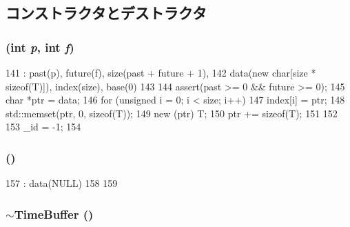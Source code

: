 \subsection{コンストラクタとデストラクタ}
\hypertarget{classTimeBuffer_afd7add7e4b5514997557fe25434baeeb}{
\subsubsection[{TimeBuffer}]{ (int {\em p}, \/  int {\em f})}}
\label{classTimeBuffer_afd7add7e4b5514997557fe25434baeeb}



\begin{DoxyCode}
141         : past(p), future(f), size(past + future + 1), 
142           data(new char[size * sizeof(T)]), index(size), base(0)
143     {
144         assert(past >= 0 && future >= 0);
145         char *ptr = data;
146         for (unsigned i = 0; i < size; i++) {
147             index[i] = ptr;
148             std::memset(ptr, 0, sizeof(T));
149             new (ptr) T;
150             ptr += sizeof(T);
151         }
152 
153         _id = -1;
154     }
\end{DoxyCode}
\hypertarget{classTimeBuffer_ac346efdd68c85717035a34ec112482f3}{
\subsubsection[{TimeBuffer}]{ ()}}
\label{classTimeBuffer_ac346efdd68c85717035a34ec112482f3}



\begin{DoxyCode}
157         : data(NULL)
158     {
159     }
\end{DoxyCode}
\hypertarget{classTimeBuffer_a342883ccc8530e75c89a30b7f7c15c65}{
\subsubsection[{$\sim$TimeBuffer}]{\setlength{\rightskip}{0pt plus 5cm}$\sim${\bf TimeBuffer} ()}}
\label{classTimeBuffer_a342883ccc8530e75c89a30b7f7c15c65}



